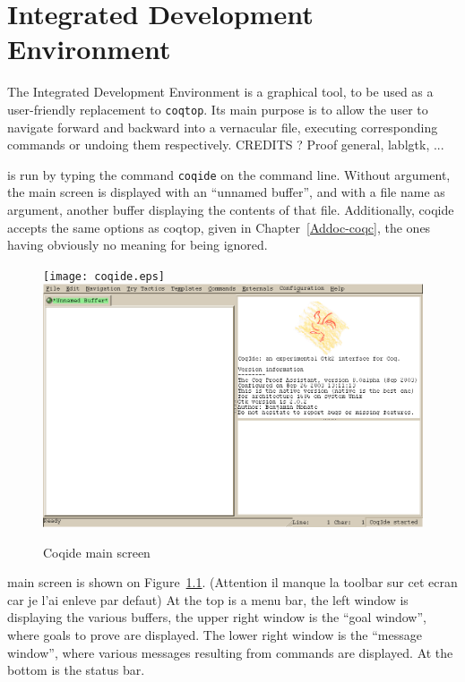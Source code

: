 \chapter{\Coq{} Integrated Development Environment}

The \Coq{} Integrated Development Environment is a graphical tool, to
be used as a user-friendly replacement to \texttt{coqtop}. Its main
purpose is to allow the user to navigate forward and backward into a
\Coq{} vernacular file, executing corresponding commands or undoing
them respectively. CREDITS ? Proof general, lablgtk, ...

\coqide{} is run by typing the command \verb|coqide| on the command
line. Without argument, the main screen is displayed with an ``unnamed
buffer'', and with a file name as argument, another buffer displaying
the contents of that file. Additionally, coqide accepts the same
options as coqtop, given in Chapter~\ref{Addoc-coqc}, the ones having
obviously no meaning for \coqide{} being ignored.

\begin{figure}[t]
\begin{center}
\ifx\pdfoutput\undefined   %
\texttt{[image: coqide.eps]}
\else
\includegraphics[width=1.0\textwidth]{coqide.png}
\fi
\end{center}
\caption{Coqide main screen}
\label{fig:coqide}
\end{figure}

\coqide{} main screen is shown on Figure~\ref{fig:coqide}.  (Attention
il manque la toolbar sur cet ecran car je l'ai enleve par defaut) At
the top is a menu bar, the left window is displaying the various
buffers, the upper right window is the ``goal window'', where goals to
prove are displayed. The lower right window is the ``message window'',
where various messages resulting from commands are displayed. At the
bottom is the status bar.

